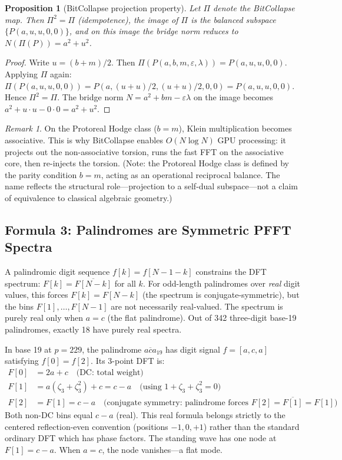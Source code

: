 \documentclass[12pt,oneside]{article}
\theoremstyle{principia}
\newtheorem{proposition}[theorem]{Proposition}
\theoremstyle{definition}
\theoremstyle{remark}
\newtheorem{remark}[theorem]{Remark}
\begin{document}
\begin{proposition}[BitCollapse projection property]\label{prop:bitcollapse}
Let $\Pi$ denote the BitCollapse map. Then $\Pi^2 = \Pi$ (idempotence), the image of $\Pi$ is the balanced subspace $\{P(a, u, u, 0, 0)\}$, and on this image the bridge norm reduces to $N(\Pi(P)) = a^2 + u^2$.
\end{proposition}

\begin{proof}
Write $u = (b+m)/2$. Then $\Pi(P(a,b,m,\varepsilon,\lambda)) = P(a,u,u,0,0)$. Applying $\Pi$ again: $\Pi(P(a,u,u,0,0)) = P(a, (u+u)/2, (u+u)/2, 0, 0) = P(a,u,u,0,0)$. Hence $\Pi^2 = \Pi$. The bridge norm $N = a^2 + bm - \varepsilon\lambda$ on the image becomes $a^2 + u \cdot u - 0 \cdot 0 = a^2 + u^2$. \qedhere
\end{proof}

\begin{remark}
On the Protoreal Hodge class ($b = m$), Klein multiplication becomes associative. This is why BitCollapse enables $O(N \log N)$ GPU processing: it projects out the non-associative torsion, runs the fast FFT on the associative core, then re-injects the torsion. (Note: the Protoreal Hodge class is defined by the parity condition $b = m$, acting as an operational reciprocal balance. The name reflects the structural role---projection to a self-dual subspace---not a claim of equivalence to classical algebraic geometry.)
\end{remark}

\subsection{Formula 3: Palindromes are Symmetric PFFT Spectra}

A palindromic digit sequence $f[k] = f[N-1-k]$ constrains the DFT spectrum: $F[k] = \overline{F[N-k]}$ for all $k$. For odd-length palindromes over \emph{real} digit values, this forces $F[k] = F[N-k]$ (the spectrum is conjugate-symmetric), but the bins $F[1], \ldots, F[N-1]$ are not necessarily real-valued. The spectrum is purely real only when $a = c$ (the flat palindrome). Out of 342 three-digit base-19 palindromes, exactly 18 have purely real spectra.

In base 19 at $p = 229$, the palindrome $\overline{aca}_{19}$ has digit signal $f = [a, c, a]$ satisfying $f[0] = f[2]$. Its 3-point DFT is:
\begin{align}
F[0] &= 2a + c \quad \text{(DC: total weight)} \\
F[1] &= a(\zeta_3 + \zeta_3^2) + c = c - a \quad \text{(using } 1 + \zeta_3 + \zeta_3^2 = 0\text{)} \\
F[2] &= F[1] = c - a \quad \text{(conjugate symmetry: palindrome forces } F[2] = \overline{F[1]} = F[1]\text{)}
\end{align}
Both non-DC bins equal $c - a$ (real). This real formula belongs strictly to the centered reflection-even convention (positions $-1, 0, +1$) rather than the standard ordinary DFT which has phase factors. The standing wave has one node at $F[1] = c - a$. When $a = c$, the node vanishes---a flat mode.
\end{document}
